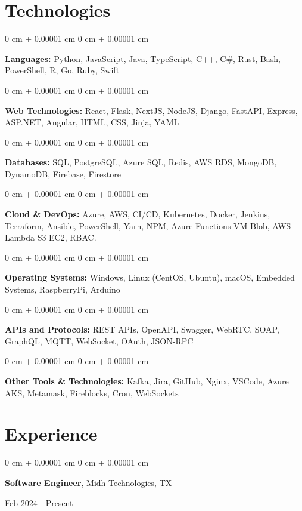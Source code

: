 \documentclass[10pt, letterpaper]{article}
\newenvironment{onecolentry}{
    \begin{adjustwidth}{
        0 cm + 0.00001 cm
    }{
        0 cm + 0.00001 cm
    }
}{
    \end{adjustwidth}
} %
\newenvironment{twocolentry}[2][]{
    \onecolentry
    \def\secondColumn{#2}
    \setcolumnwidth{\fill, 4.5 cm}
    \begin{paracol}{2}
}{
    \switchcolumn \raggedleft \secondColumn
    \end{paracol}
    \endonecolentry
} %
\begin{document}
\section{Technologies}
\begin{onecolentry}
	\textbf{Languages:} Python, JavaScript, Java, TypeScript, C++, C\#, Rust, Bash, PowerShell, R, Go, Ruby, Swift
\end{onecolentry}
\begin{onecolentry}
	\textbf{Web Technologies:} React, Flask, NextJS, NodeJS, Django, FastAPI, Express, ASP.NET, Angular, HTML, CSS, Jinja, YAML
\end{onecolentry}
\begin{onecolentry}
	\textbf{Databases:} SQL, PostgreSQL, Azure SQL, Redis, AWS RDS, MongoDB, DynamoDB, Firebase, Firestore
\end{onecolentry}
\begin{onecolentry}
	\textbf{Cloud \& DevOps:} Azure, AWS, CI/CD, Kubernetes, Docker, Jenkins, Terraform, Ansible, PowerShell, Yarn, NPM, Azure Functions VM Blob, AWS Lambda S3 EC2, RBAC.
\end{onecolentry}
\begin{onecolentry}
	\textbf{Operating Systems:} Windows, Linux (CentOS, Ubuntu), macOS, Embedded Systems, RaspberryPi, Arduino
\end{onecolentry}
\begin{onecolentry}
	\textbf{APIs and Protocols:} REST APIs, OpenAPI, Swagger, WebRTC, SOAP, GraphQL, MQTT, WebSocket, OAuth, JSON-RPC
\end{onecolentry}
\begin{onecolentry}
	\textbf{Other Tools \& Technologies:} Kafka, Jira, GitHub, Nginx, VSCode, Azure AKS, Metamask, Fireblocks, Cron, WebSockets
\end{onecolentry}



\section{Experience}

\begin{twocolentry}{
		Feb 2024 - Present
	}
	\textbf{Software Engineer}, Midh Technologies, TX
\end{twocolentry}
\end{document}
